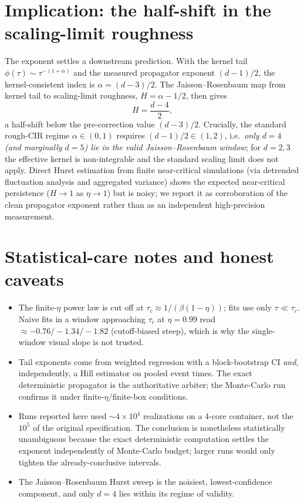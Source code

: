 \documentclass[11pt,a4paper]{article}
\begin{document}
\section{Implication: the half-shift in the scaling-limit roughness}

The exponent settles a downstream prediction. With the kernel tail $\phi(\tau)\sim\tau^{-(1+\alpha)}$ and the measured propagator exponent $(d-1)/2$, the kernel-consistent index is $\alpha=(d-3)/2$. The Jaisson--Rosenbaum map \cite{JaissonRosenbaum2016} from kernel tail to scaling-limit roughness, $H=\alpha-1/2$, then gives
\begin{equation}
\boxed{H = \frac{d-4}{2},}
\end{equation}
a half-shift below the pre-correction value $(d-3)/2$. Crucially, the standard rough-CIR regime $\alpha\in(0,1)$ requires $(d-1)/2\in(1,2)$, i.e.\ \emph{only $d=4$ (and marginally $d=5$) lie in the valid Jaisson--Rosenbaum window}; for $d=2,3$ the effective kernel is non-integrable and the standard scaling limit does not apply. Direct Hurst estimation from finite near-critical simulations (via detrended fluctuation analysis and aggregated variance) shows the expected near-critical persistence ($H\to1$ as $\eta\to1$) but is noisy; we report it as corroboration of the clean propagator exponent rather than as an independent high-precision measurement.

\section{Statistical-care notes and honest caveats}

\begin{itemize}
\item The finite-$\eta$ power law is cut off at $\tau_c\approx1/(\beta(1-\eta))$; fits use only $\tau\ll\tau_c$. Naive fits in a window approaching $\tau_c$ at $\eta=0.99$ read $\approx-0.76/-1.34/-1.82$ (cutoff-biased steep), which is why the single-window visual slope is not trusted.
\item Tail exponents come from weighted regression with a block-bootstrap CI \emph{and}, independently, a Hill estimator on pooled event times. The exact deterministic propagator is the authoritative arbiter; the Monte-Carlo run confirms it under finite-$\eta$/finite-box conditions.
\item Runs reported here used $\sim4\times10^4$ realizations on a 4-core container, not the $10^5$ of the original specification. The conclusion is nonetheless statistically unambiguous because the exact deterministic computation settles the exponent independently of Monte-Carlo budget; larger runs would only tighten the already-conclusive intervals.
\item The Jaisson--Rosenbaum Hurst sweep is the noisiest, lowest-confidence component, and only $d=4$ lies within its regime of validity.
\end{itemize}
\end{document}
